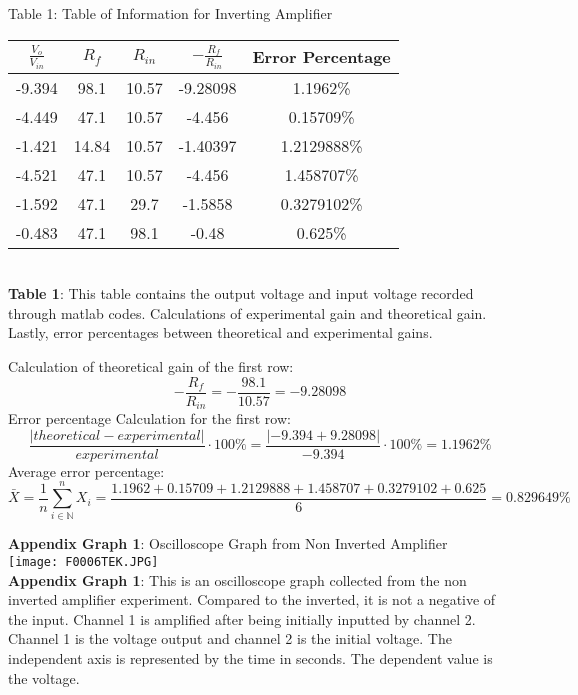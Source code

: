 \documentclass[11pt]{article}
\def\N{{\mathbb{N}}}
\begin{document}
\begin{center}
\caption{Table 1: Table of Information for Inverting Amplifier} 
 \begin{tabular}{||c c c c c||} 
 \hline
 $\frac{V_o}{V_{in}}$ & $R_f$ & $R_{in}$ & $-\frac{R_f}{R_{in}}$ & Error Percentage \\ [0.5ex] 
 \hline\hline
 -9.394 & 98.1 & 10.57 & -9.28098 & 1.1962\%\\ 
 \hline
 -4.449 & 47.1 & 10.57 & -4.456 & 0.15709\%\\
 \hline
 -1.421 & 14.84 & 10.57 & -1.40397 & 1.2129888\%\\
 \hline
 -4.521 & 47.1 & 10.57 & -4.456 & 1.458707\%\\
 \hline
 -1.592 & 47.1 & 29.7 & -1.5858 & 0.3279102\%\\
 \hline
 -0.483 & 47.1 & 98.1 & -0.48 & 0.625\%\\ [1ex] 
 \hline
\end{tabular}
\\\textbf{Table 1}: This table contains the output voltage and input voltage recorded through matlab codes. Calculations of experimental gain and theoretical gain. Lastly, error percentages between theoretical and experimental gains. 
\end{center}
Calculation of theoretical gain of the first row:
\[-\frac{R_f}{R_{in}}=-\frac{98.1}{10.57}=-9.28098\]
Error percentage Calculation for the first row:
\[\frac{|theoretical-experimental|}{experimental}\cdot 100\% =\frac{|-9.394+9.28098|}{-9.394}\cdot 100\%=1.1962\%\]
Average error percentage:
\[\bar X= \frac{1}{n}\sum^n_{i\in\N}X_i=\frac{1.1962+0.15709+1.2129888+1.458707+0.3279102+0.625}{6}=0.829649 \%\]
\newpage
\begin{center}
    \textbf{Appendix Graph 1}: Oscilloscope Graph from Non Inverted Amplifier\\
    \texttt{[image: F0006TEK.JPG]}\\\textbf{Appendix Graph 1}: This is an oscilloscope graph collected from the non inverted amplifier experiment. Compared to the inverted, it is not a negative of the input. Channel 1 is amplified after being initially inputted by channel 2. Channel 1 is the voltage output and channel 2 is the initial voltage. The independent axis is represented by the time in seconds. The dependent value is the voltage. 
\end{center}
\end{document}
